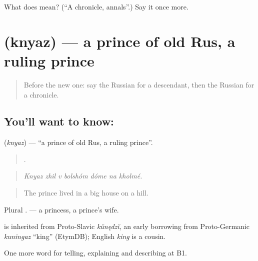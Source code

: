 \begin{tcolorbox}[breakable,colback=teal!4,colframe=teal!35!black,title={Before you move on}]
What does  mean? (\textquotedblleft{}A chronicle, annals\textquotedblright{}.) Say it once more.
\end{tcolorbox}
\section[\texorpdfstring{\ru{князь} (knyaz)}{князь (knyaz)}]{ (knyaz) — a prince of old Rus, a ruling prince}

\label{lesson:RU-C326-knyaz}



\begin{quote}
Before the new one: say the Russian for a descendant, then the Russian for a chronicle.
\end{quote}

\subsection*{You'll want to know: }
\textbf{} (\emph{knyaz}) — \textquotedblleft{}a prince of old Rus, a ruling prince\textquotedblright{}.

\begin{quote}
      .
\end{quote}

\begin{quote}
\emph{Knyaz zhil v bolshóm dóme na kholmé.}
\end{quote}

\begin{quote}
The prince lived in a big house on a hill.
\end{quote}

Plural \emph{}. \emph{} — a princess, a prince's wife.

\begin{cousinweb}
\emph{} is inherited from Proto-Slavic \emph{kŭnędzĭ}, an early borrowing from Proto-Germanic \emph{kuningaz} \textquotedblleft{}king\textquotedblright{} (EtymDB); English \emph{king} is a cousin.
\end{cousinweb}

\begin{grammarlens}[title={What you've built}]
One more word for telling, explaining and describing at B1.
\end{grammarlens}

